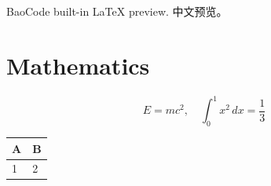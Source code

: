 \documentclass{article}
\begin{document}
BaoCode built-in LaTeX preview. 中文预览。
\section{Mathematics}
\[E=mc^2,\quad \int_0^1 x^2\,dx=\frac{1}{3}\]
\begin{tabular}{ll}\toprule A&B\\\midrule 1&2\\\bottomrule\end{tabular}
\end{document}
